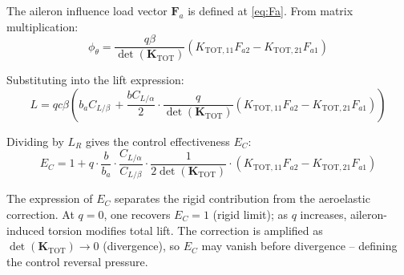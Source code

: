 The aileron influence load vector $\mathbf{F}_a$ is defined at \eqref{eq:Fa}. From matrix multiplication:
\begin{equation}
\phi_\theta
=
\frac{q \beta}{\det(\mathbf{K}_{\mathrm{TOT}})}
\left(
K_{\mathrm{TOT},11} F_{a2}
-
K_{\mathrm{TOT},21} F_{a1}
\right)
\end{equation}

\vspace{0.5cm}

Substituting into the lift expression:
\begin{equation}
L =q c \beta \left(
b_a C_{L/\beta}\,
+
 \frac{b C_{L/\alpha}}{2}
\cdot
\frac{q }{\det(\mathbf{K}_{\mathrm{TOT}})}
\left(
K_{\mathrm{TOT},11} F_{a2}
-
K_{\mathrm{TOT},21} F_{a1}
\right) \right)
\end{equation}

Dividing by $L_R$ gives the control effectiveness $E_C$:
\begin{equation}
\boxed{
E_C
=
1
+
q \cdot \frac{b}{b_a}\cdot \frac{C_{L/\alpha}}{C_{L/\beta}}
\cdot
\frac{1}{2 \det(\mathbf{K}_{\mathrm{TOT}})} \cdot 
\left(
K_{\mathrm{TOT},11} F_{a2}
-
K_{\mathrm{TOT},21} F_{a1}
\right)
}
\end{equation}

The expression of $E_C$ separates the rigid contribution from the aeroelastic correction.
At $q=0$, one recovers $E_C=1$ (rigid limit); as $q$ increases, aileron-induced torsion
modifies total lift. The correction is amplified as $\det(\mathbf{K}_{\mathrm{TOT}})\to 0$
(divergence), so $E_C$ may vanish before divergence -- defining the control reversal pressure.